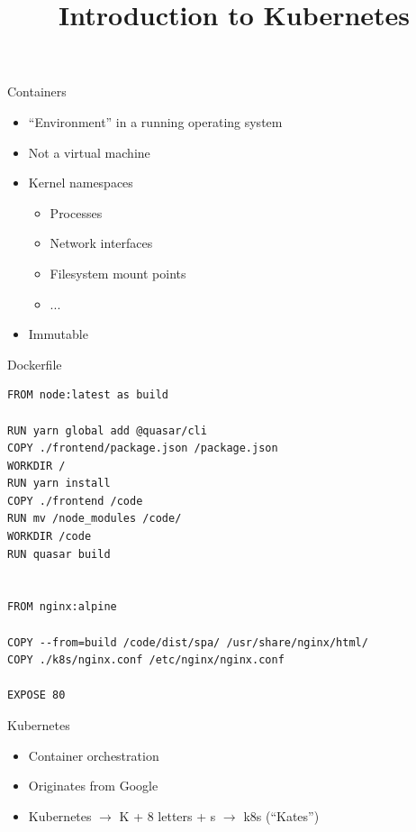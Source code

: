 \documentclass{dcpresentation}
\title{Introduction to Kubernetes}
\author{}
\institute{SciLifeLab Data Centre}
\date{}
\begin{document}
 \begin{frame}
  \maketitle
 \end{frame}

 
 \begin{frame}{Containers}
  \begin{itemize}
   \item ``Environment'' in a running operating system
   \item Not a virtual machine
   \item Kernel namespaces
   \begin{itemize}
    \item Processes
    \item Network interfaces
    \item Filesystem mount points
    \item ...
   \end{itemize}
   \item Immutable
  \end{itemize}
 \end{frame}
 
 \begin{frame}[fragile]{Dockerfile}
 \scriptsize
  \begin{verbatim}
FROM node:latest as build

RUN yarn global add @quasar/cli
COPY ./frontend/package.json /package.json
WORKDIR /
RUN yarn install
COPY ./frontend /code
RUN mv /node_modules /code/
WORKDIR /code
RUN quasar build


FROM nginx:alpine

COPY --from=build /code/dist/spa/ /usr/share/nginx/html/
COPY ./k8s/nginx.conf /etc/nginx/nginx.conf

EXPOSE 80
  \end{verbatim}
 \end{frame}


 \begin{frame}{Kubernetes}
  \begin{itemize}
   \item Container orchestration
   \item Originates from Google
   \item Kubernetes $\rightarrow$ K + 8 letters + s $\rightarrow$ k8s (``Kates'')
  \end{itemize}
 \end{frame}
 
\end{document}
